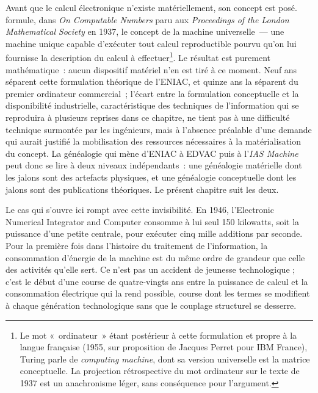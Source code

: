 Avant que le calcul électronique n'existe matériellement, son concept est posé. \textcite{turing_computable_1936} formule, dans \emph{On Computable Numbers} paru aux \emph{Proceedings of the London Mathematical Society} en 1937, le concept de la machine universelle~--- une machine unique capable d'exécuter tout calcul reproductible pourvu qu'on lui fournisse la description du calcul à effectuer\footnote{Le mot «~ordinateur~» étant postérieur à cette formulation et propre à la langue française (1955, sur proposition de Jacques Perret pour IBM France), Turing parle de \emph{computing machine}, dont sa version universelle est la matrice conceptuelle. La projection rétrospective du mot ordinateur sur le texte de 1937 est un anachronisme léger, sans conséquence pour l'argument.}. Le résultat est purement mathématique~: aucun dispositif matériel n'en est tiré à ce moment. Neuf ans séparent cette formulation théorique de l'ENIAC, et quinze ans la séparent du premier ordinateur commercial~; l'écart entre la formulation conceptuelle et la disponibilité industrielle, caractéristique des techniques de l'information qui se reproduira à plusieurs reprises dans ce chapitre, ne tient pas à une difficulté technique surmontée par les ingénieurs, mais à l'absence préalable d'une demande qui aurait justifié la mobilisation des ressources nécessaires à la matérialisation du concept. La généalogie qui mène d'ENIAC à EDVAC puis à l'\emph{IAS Machine} peut donc se lire à deux niveaux indépendants~: une généalogie matérielle dont les jalons sont des artefacts physiques, et une généalogie conceptuelle dont les jalons sont des publications théoriques. Le présent chapitre suit les deux.

%
Le cas qui s'ouvre ici rompt avec cette invisibilité. En 1946, l'Electronic Numerical Integrator and Computer consomme à lui seul 150 kilowatts, soit la puissance d'une petite centrale, pour exécuter cinq mille additions par seconde. Pour la première fois dans l'histoire du traitement de l'information, la consommation d'énergie de la machine est du même ordre de grandeur que celle des activités qu'elle sert. Ce n'est pas un accident de jeunesse technologique ; c'est le début d'une course de quatre-vingts ans entre la puissance de calcul et la consommation électrique qui la rend possible, course dont les termes se modifient à chaque génération technologique sans que le couplage structurel se desserre.

